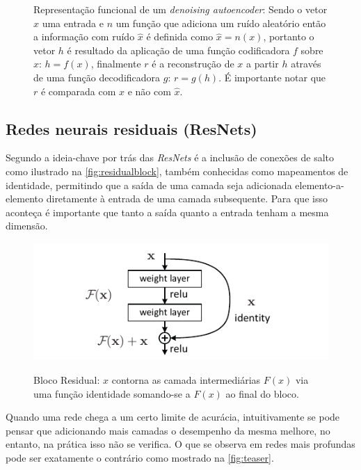 				\begin{figure}[h]
					\centering
					\caption[Representação funcional de um \textit{denoising autoencoder}]{Representação funcional de um \textit{denoising autoencoder}: Sendo o vetor $x$ uma entrada e $n$ um função que adiciona um ruído aleatório então a informação com ruído $\hat{x}$ é definida como $\hat{x} = n(x)$, portanto o vetor $h$ é resultado da aplicação de uma função codificadora $f$ sobre $x$: $h = f(x)$, finalmente $r$ é a reconstrução de $x$ a partir $h$ através de uma função decodificadora $g$: $r = g(h)$. É importante notar que $r$ é comparada com $x$ e não com $\hat{x}$.}
					
					\label{fig:denoisingAutoencoder}
				\end{figure}
							
		\subsection{Redes neurais residuais (ResNets)}
			\par Segundo \cite{DBLP:journals/corr/HeZRS15} a ideia-chave por trás das \textit{ResNets} é a inclusão de conexões de salto como ilustrado na  \autoref{fig:residualblock}, também conhecidas como mapeamentos de identidade, permitindo que a saída de uma camada seja adicionada elemento-a-elemento diretamente à entrada de uma camada subsequente. Para que isso aconteça é importante que tanto a saída quanto a entrada tenham a mesma dimensão.
			
			\begin{figure}[H]
				\centering
				\caption[Bloco residual]{Bloco Residual: $x$ contorna as camada intermediárias $F(x)$ via uma função identidade somando-se a $F(x)$ ao final do bloco.}
				\includegraphics[width=0.7\linewidth]{images/residualBlock}
				\label{fig:residualblock}
			\end{figure}
			
			
			\par Quando uma rede chega a um certo limite de acurácia, intuitivamente se pode pensar que adicionando mais camadas o desempenho da mesma melhore, no entanto, na prática isso não se verifica. O que se observa em redes mais profundas pode ser exatamente o contrário como mostrado na \autoref{fig:teaser}.
			
